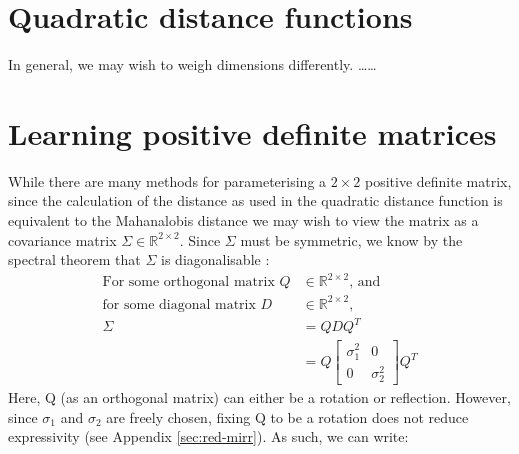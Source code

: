 \documentclass[a4paper, 12pt]{report}
\def\comment#1{\color{red}#1\color{black}}
\begin{document}
\section{Quadratic distance functions}
In general, we may wish to weigh dimensions differently. \comment{\ldots\ldots}


\section{Learning positive definite matrices}
\label{sec:learning-pdm}
While there are many methods for parameterising a $2\times2$ positive definite matrix, since the calculation of the distance as used in the quadratic distance function is equivalent to the Mahanalobis distance we may wish to view the matrix as a covariance matrix $\Sigma \in \mathbb{R}^{2\times2}$. Since $\Sigma$ must be symmetric, we know by the spectral theorem that $\Sigma$ is diagonalisable \cite{poole2015linear}:
\begin{align}
\textrm{For some orthogonal matrix }Q &\in \mathbb{R}^{2\times 2} \textrm{, and} \nonumber \\
\textrm{for some diagonal matrix }D &\in \mathbb{R}^{2\times 2} \textrm{,}\nonumber \\
\Sigma &= QDQ^T\\
&= Q \begin{bmatrix}
	 \sigma_1^2 & 0\\ 0 &  \sigma_2^2
\end{bmatrix} Q^T
\end{align}
Here, Q (as an orthogonal matrix) can either be a rotation or reflection. However, since $\sigma_1$ and $\sigma_2$ are freely chosen, fixing Q to be a rotation does not reduce expressivity (see Appendix \ref{sec:red-mirr}). As such, we can write:
\end{document}

